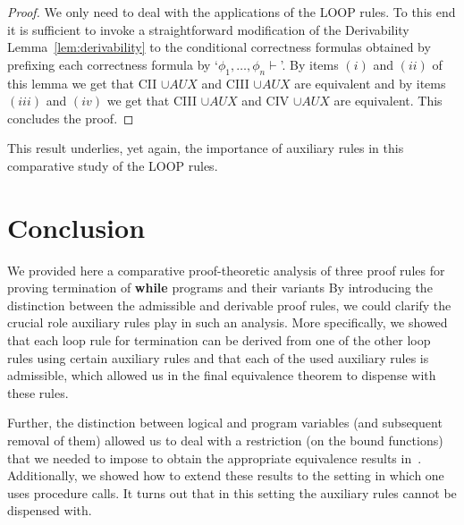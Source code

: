 \documentclass[manuscript, screen, review]{acmart}
\newcommand{\AUX}{\mathit{AUX}}
\begin{document}
\begin{proof}
  We only need to deal with the applications of the LOOP rules. To this end it
  is sufficient to invoke a straightforward modification of the
  Derivability Lemma~\ref{lem:derivability} to the conditional
  correctness formulas obtained by prefixing each correctness formula
  by `$\phi_1, \dots, \phi_n \vdash$'.  By items $(i)$ and $(ii)$ of
  this lemma we get that CII $\cup \AUX$ and CIII $\cup \AUX$ are
  equivalent and by items $(iii)$ and $(iv)$ we get that CIII
  $\cup \AUX$ and CIV $\cup \AUX$ are equivalent. This concludes the
  proof.
\end{proof}

This result underlies, yet again, the importance of auxiliary rules in this comparative study of
the LOOP rules.


\section{Conclusion}
\label{sec:conc}

We provided here a comparative proof-theoretic analysis of three proof
rules for proving termination of \textbf{while} programs
and their variants %
By introducing the distinction between the admissible and derivable
proof rules, we could clarify the crucial role auxiliary rules play in
such an analysis. More specifically, we showed that 
each loop rule for termination can be derived from one of the
other loop rules using certain auxiliary rules
and that each of the used auxiliary rules is admissible,
which allowed us in the final equivalence theorem to dispense with these rules.

Further, the distinction between logical and program variables (and
subsequent removal of them) allowed us to deal with a restriction 
(on the bound functions) that we needed to impose to obtain the
appropriate equivalence results in~\cite{ABO25}.
Additionally, we showed how to extend these results to the setting in
which one uses procedure calls. It turns out that in this setting the
auxiliary rules cannot be dispensed with.



%

% 

%

\appendix
\end{document}
